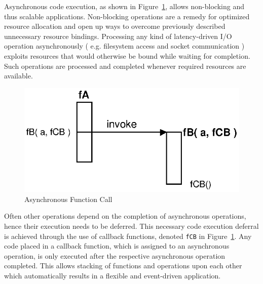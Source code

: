 Asynchronous code execution, as shown in Figure~\ref{fig:Closures_Asynchronous}, allows non-blocking and thus scalable applications.
Non-blocking operations are a remedy for optimized resource allocation and open up ways to overcome previously described unnecessary resource bindings.
Processing any kind of latency-driven I/O operation asynchronously ( e.g. filesystem access and socket communication ) exploits resources that would otherwise be bound while waiting for completion.
Such operations are processed and completed whenever required resources are available.
\begin{figure}[!ht]
	\centering
  \includegraphics{figures/Closures_Asynchronous}
	\caption{Asynchronous Function Call}
	\label{fig:Closures_Asynchronous}
\end{figure}

Often other operations depend on the completion of asynchronous operations, hence their execution needs to be deferred.
This necessary code execution deferral is achieved through the use of callback functions, denoted \texttt{fCB} in Figure~\ref{fig:Closures_Asynchronous}.
Any code placed in a callback function, which is assigned to an asynchronous operation, is only executed after the respective asynchronous operation completed.
This allows stacking of functions and operations upon each other which automatically results in a flexible and event-driven application.

